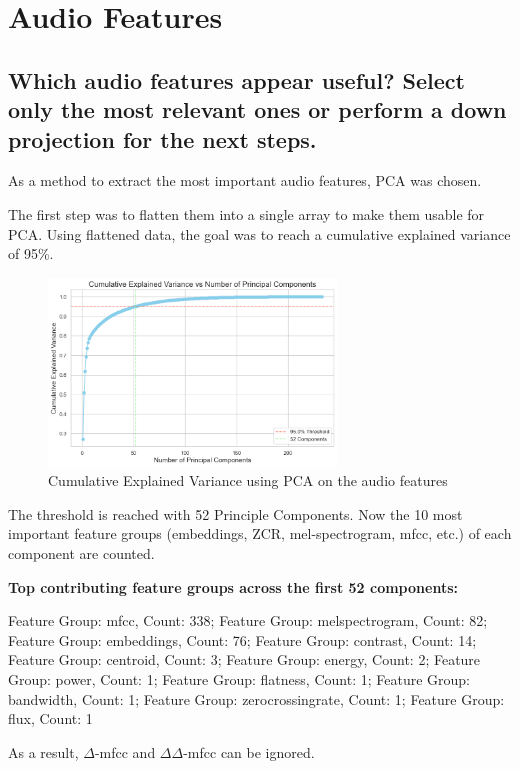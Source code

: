 
\section{Audio Features}
\label{sec:Audio Features}


\subsection{Which audio features appear useful? Select only the most relevant ones or perform a down projection for the next steps.}
\label{sec:Audio Features:a}

As a method to extract the most important audio features, PCA was chosen.

The first step was to flatten them into a single array to make them usable for PCA. Using flattened data, the goal was to reach a cumulative explained variance of 95\%.
\newpage
\begin{figure}[htbp]
    \centering
    \includegraphics[width=0.5\linewidth, height=5cm]{figs/Cumulative Explained Variance.png}
    \caption{Cumulative Explained Variance using PCA on the audio features}
    \label{fig:Cumulative Explained Variance}
\end{figure}

The threshold is reached with 52 Principle Components. Now the 10 most important feature groups (embeddings, ZCR, mel-spectrogram, mfcc, etc.) of each component are counted. 

\textbf{Top contributing feature groups across the first 52 components:}

Feature Group: mfcc, Count: 338;
Feature Group: melspectrogram, Count: 82;
Feature Group: embeddings, Count: 76;
Feature Group: contrast, Count: 14;
Feature Group: centroid, Count: 3;
Feature Group: energy, Count: 2;
Feature Group: power, Count: 1;
Feature Group: flatness, Count: 1;
Feature Group: bandwidth, Count: 1;
Feature Group: zerocrossingrate, Count: 1;
Feature Group: flux, Count: 1

As a result, $\Delta$-mfcc and $\Delta\Delta$-mfcc can be ignored.

